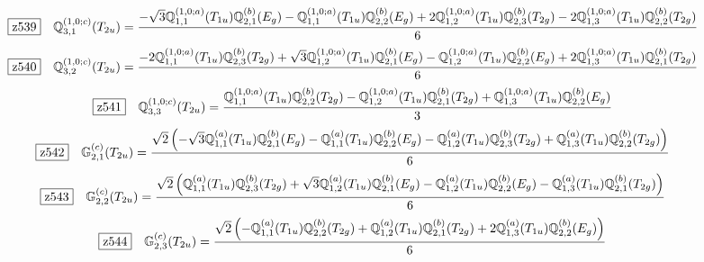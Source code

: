 \documentclass[fleqn,10pt,landscape]{jsarticle}
\begin{document}
\begin{dmath*}
\hspace*{3mm}\fbox{z539}\quad \mathbb{Q}_{3,1}^{(1,0;c)}(T_{2u})=\frac{- \sqrt{3} \mathbb{Q}_{1,1}^{(1,0;a)}(T_{1u}) \mathbb{Q}_{2,1}^{(b)}(E_{g}) - \mathbb{Q}_{1,1}^{(1,0;a)}(T_{1u}) \mathbb{Q}_{2,2}^{(b)}(E_{g}) + 2 \mathbb{Q}_{1,2}^{(1,0;a)}(T_{1u}) \mathbb{Q}_{2,3}^{(b)}(T_{2g}) - 2 \mathbb{Q}_{1,3}^{(1,0;a)}(T_{1u}) \mathbb{Q}_{2,2}^{(b)}(T_{2g})}{6}
\end{dmath*}
\begin{dmath*}
\hspace*{3mm}\fbox{z540}\quad \mathbb{Q}_{3,2}^{(1,0;c)}(T_{2u})=\frac{- 2 \mathbb{Q}_{1,1}^{(1,0;a)}(T_{1u}) \mathbb{Q}_{2,3}^{(b)}(T_{2g}) + \sqrt{3} \mathbb{Q}_{1,2}^{(1,0;a)}(T_{1u}) \mathbb{Q}_{2,1}^{(b)}(E_{g}) - \mathbb{Q}_{1,2}^{(1,0;a)}(T_{1u}) \mathbb{Q}_{2,2}^{(b)}(E_{g}) + 2 \mathbb{Q}_{1,3}^{(1,0;a)}(T_{1u}) \mathbb{Q}_{2,1}^{(b)}(T_{2g})}{6}
\end{dmath*}
\begin{dmath*}
\hspace*{3mm}\fbox{z541}\quad \mathbb{Q}_{3,3}^{(1,0;c)}(T_{2u})=\frac{\mathbb{Q}_{1,1}^{(1,0;a)}(T_{1u}) \mathbb{Q}_{2,2}^{(b)}(T_{2g}) - \mathbb{Q}_{1,2}^{(1,0;a)}(T_{1u}) \mathbb{Q}_{2,1}^{(b)}(T_{2g}) + \mathbb{Q}_{1,3}^{(1,0;a)}(T_{1u}) \mathbb{Q}_{2,2}^{(b)}(E_{g})}{3}
\end{dmath*}
\begin{dmath*}
\hspace*{3mm}\fbox{z542}\quad \mathbb{G}_{2,1}^{(c)}(T_{2u})=\frac{\sqrt{2} \left(- \sqrt{3} \mathbb{Q}_{1,1}^{(a)}(T_{1u}) \mathbb{Q}_{2,1}^{(b)}(E_{g}) - \mathbb{Q}_{1,1}^{(a)}(T_{1u}) \mathbb{Q}_{2,2}^{(b)}(E_{g}) - \mathbb{Q}_{1,2}^{(a)}(T_{1u}) \mathbb{Q}_{2,3}^{(b)}(T_{2g}) + \mathbb{Q}_{1,3}^{(a)}(T_{1u}) \mathbb{Q}_{2,2}^{(b)}(T_{2g})\right)}{6}
\end{dmath*}
\begin{dmath*}
\hspace*{3mm}\fbox{z543}\quad \mathbb{G}_{2,2}^{(c)}(T_{2u})=\frac{\sqrt{2} \left(\mathbb{Q}_{1,1}^{(a)}(T_{1u}) \mathbb{Q}_{2,3}^{(b)}(T_{2g}) + \sqrt{3} \mathbb{Q}_{1,2}^{(a)}(T_{1u}) \mathbb{Q}_{2,1}^{(b)}(E_{g}) - \mathbb{Q}_{1,2}^{(a)}(T_{1u}) \mathbb{Q}_{2,2}^{(b)}(E_{g}) - \mathbb{Q}_{1,3}^{(a)}(T_{1u}) \mathbb{Q}_{2,1}^{(b)}(T_{2g})\right)}{6}
\end{dmath*}
\begin{dmath*}
\hspace*{3mm}\fbox{z544}\quad \mathbb{G}_{2,3}^{(c)}(T_{2u})=\frac{\sqrt{2} \left(- \mathbb{Q}_{1,1}^{(a)}(T_{1u}) \mathbb{Q}_{2,2}^{(b)}(T_{2g}) + \mathbb{Q}_{1,2}^{(a)}(T_{1u}) \mathbb{Q}_{2,1}^{(b)}(T_{2g}) + 2 \mathbb{Q}_{1,3}^{(a)}(T_{1u}) \mathbb{Q}_{2,2}^{(b)}(E_{g})\right)}{6}
\end{dmath*}
\end{document}
